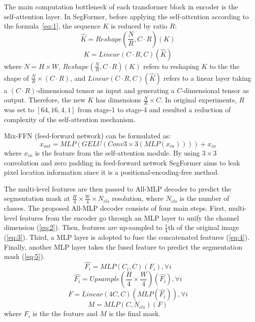 The main computation bottleneck of each transformer block in encoder is the self-attention layer. In SegFormer, before applying the self-attention according to the formula~\ref{eq:1}, the sequence $K$ is reduced by ratio $R$:
$$\hat{K} = Reshape(\frac{N}{R}, C\cdot R)(K)$$
$$K = Linear(C \cdot R, C)(\hat{K})$$
where $N = H \times W$, $Reshape(\frac{N}{R}, C \cdot R)(K)$ refers to reshaping $K$ to the the shape of $\frac{N}{R} \times (C \cdot R)$, and $Linear(C \cdot R, C)(\hat{K})$ refers to a linear layer taking a $(C \cdot R)$-dimensional tensor as input and generating a $C$-dimensional tensor as output. Therefore, the new $K$ has dimensions $\frac{N}{R} \times C$. 
In original experiments, $R$ was set to $[64, 16, 4, 1]$ from stage-1 to stage-4 and
resulted a reduction of complexity of the self-attention mechanism.

Mix-FFN (feed-forward network) can be formulated as:
$$x_{out} = MLP(GELU(Conv 3\times 3(MLP(x_{in})))) + x_{in}$$
where $x_{in}$ is the feature from the self-attention module. By using $3 \times 3$ convolution and zero padding in feed-forward network SegFormer aims to leak pixel location information since it is a positional-encoding-free method.


The multi-level features are then passed to All-MLP decoder to predict the segmentation mask at $\frac{H}{4}\times \frac{W}{4}\times N_{cls}$ resolution, where $N_{cls}$ is the number of classes.
The proposed All-MLP decoder consists of four main steps. First, multi-level features from
the encoder go through an MLP layer to unify the channel dimension (\ref{eq:2}). Then, features are up-sampled to $\frac{1}{4}$th of the original image (\ref{eq:3}). Third, a MLP layer is adopted to fuse the concatenated features (\ref{eq:4}). Finally, another MLP layer takes the fused feature to predict the segmentation mask (\ref{eq:5}).
\begin{equation} \label{eq:2}
\hat{F_i} = MLP(C_i, C)(F_i), \forall i
\end{equation}
\begin{equation} \label{eq:3}
\hat{F_i} = Upsample(\frac{H}{4}\times \frac{W}{4})(\hat{F_i}), \forall i
\end{equation}
\begin{equation} \label{eq:4}
F = Linear(4C, C)(MLP(\hat{F_i})), \forall i
\end{equation}
\begin{equation} \label{eq:5}
M = MLP(C, N_{cls})(F)
\end{equation}
where $F_i$ is the the feature and $M$ is the final mask.

